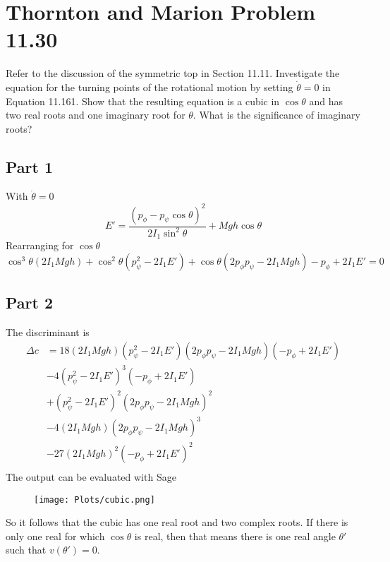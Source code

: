 \section{Thornton and Marion Problem 11.30}
Refer to the discussion of the symmetric top in Section 11.11. Investigate the equation for the turning points of the rotational motion by setting $\dot{\theta} = 0$ in Equation 11.161. Show that the resulting equation is a cubic in $\cos \theta$ and has two real roots and one imaginary root for $\theta$. What is the significance of imaginary roots?

\subsection{Part 1}
With $\dot{\theta}=0$
\begin{equation}
    E' = \frac{(p_\phi -p_\psi \cos \theta)^2}{2I_1 \sin^2 \theta} + Mgh \cos \theta
\end{equation}
Rearranging for $\cos \theta$
\begin{equation}
    \cos^3 \theta (2I_1 M g h) + \cos^2 \theta (p_\psi^2 - 2I_1 E') + \cos \theta (2 p_\phi p_\psi - 2I_1Mgh) - p_\phi+ 2I_1E' =0
\end{equation}

\subsection{Part 2}
The discriminant is
\begin{equation}
\begin{split}
      \Delta c & = 18(2I_1 M g h)(p_\psi^2 - 2I_1 E')(2 p_\phi p_\psi - 2I_1Mgh)(-p_\phi+ 2I_1E')\\
      & - 4(p_\psi^2 - 2I_1 E')^3(-p_\phi+ 2I_1E')\\
      & + (p_\psi^2 - 2I_1 E')^2(2 p_\phi p_\psi - 2I_1Mgh)^2\\
      & - 4(2I_1 M g h)(2 p_\phi p_\psi - 2I_1Mgh)^3\\
      & - 27(2I_1 M g h)^2(-p_\phi+ 2I_1E')^2\\
\end{split}
\end{equation}
The output can be evaluated with Sage
\begin{figure}[h]
    \centering
    \texttt{[image: Plots/cubic.png]}
\end{figure}

So it follows that the cubic has one real root and two complex roots. If there is only one real for which $\cos \theta$ is real, then that means there is one real angle $\theta '$ such that $v(\theta ') = 0$.


